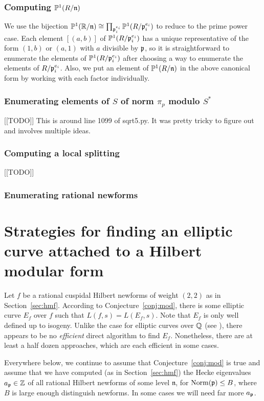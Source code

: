 \documentclass{amsart}
\newcommand{\n}{\mathfrak{n}}
\begin{document}
\subsubsection{Computing $\P^1(R/\n)$}
We use the bijection $\P^1(\R/\n) \isom \prod_{\p_i^{e_i}}
\P^1(R/\p_i^{e_i})$ to reduce to the prime power case.  Each element
$[(a,b)]$ of $\mathbb{P}^1(R/\mathfrak{p}_i^{e_i})$ has a unique representative of the
form $(1,b)$ or $(a,1)$ with $a$ divisible by $\mathfrak{p}$, so it is straightforward
to enumerate the elements of $\mathbb{P}^1(R/\mathfrak{p}_i^{e_i})$ after choosing a way
to enumerate the elements of $R/\mathfrak{p}_i^{e_i}$.  Also, we put an element
of $\P^1(R/\n)$ in the above canonical form by working with each factor
individually. 


\subsubsection{Enumerating elements of $S$ of norm $\pi_p$ modulo $S^*$}
[[TODO]]
This is around line 1099 of sqrt5.py.  It was pretty tricky to figure out
and involves multiple ideas.

\subsubsection{Computing a local splitting}
[[TODO]]

\subsubsection{Enumerating rational newforms}



\section{Strategies for finding an elliptic curve attached to a Hilbert modular form}\label{sec:finding}
Let $f$ be a rational cuspidal Hilbert newforms of weight $(2,2)$ as
in Section~\ref{sec:hmf}.  According to Conjecture~\ref{conj:mod},
there is some elliptic curve $E_f$ over $f$ such that $L(f,s) =
L(E_f,s)$.  Note that $E_f$ is only well defined up to isogeny.
Unlike the case for elliptic curves over $\mathbb{Q}$ (see
\cite{cremona:algs}), there appears to be no {\em efficient} direct
algorithm to find $E_f$.  Nonetheless, there are at least a half dozen
approaches, which are each efficient in some cases.

Everywhere below, we continue to assume that Conjecture~\ref{conj:mod}
is true and assume that we have computed (as in Section~\ref{sec:hmf})
the Hecke eigenvalues $a_{\mathfrak{p}}\in \mathbb{Z}$ of all rational Hilbert newforms of
some level $\n$, for $\operatorname{Norm}(\mathfrak{p})\leq B$, where $B$ is large enough
distinguish newforms.  In some cases we will need far more $a_{\mathfrak{p}}$.
\end{document}
